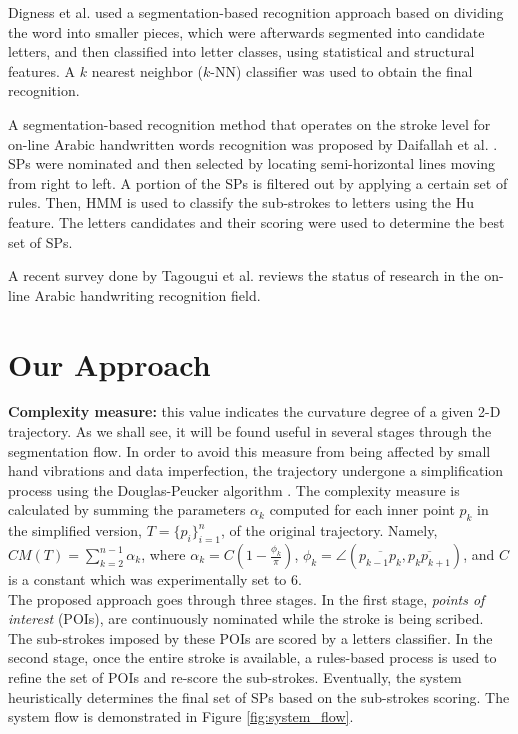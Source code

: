 \documentclass[10pt, conference, compsocconf]{IEEEtran}
\begin{document}
Digness et al. \cite{Dinges2011} used a segmentation-based recognition approach based on dividing the word into smaller pieces, which were afterwards segmented into candidate letters, and then classified into letter classes, using statistical and structural features. 
A $k$ nearest neighbor ($k$-NN) classifier was used to obtain the final recognition.

A segmentation-based recognition method that operates on the stroke level for on-line Arabic handwritten words recognition was proposed by Daifallah et al. \cite{daifallah2009recognition}. 
SPs were nominated and then selected by locating semi-horizontal lines moving from right to left. 
A portion of the SPs is filtered out by applying a certain set of rules. 
Then, HMM is used to classify the sub-strokes to letters using the Hu feature. 
The letters candidates and their scoring were used to determine the best set of SPs.

A recent survey done by Tagougui et al. \cite{tagougui2013online} reviews the status of research in the on-line Arabic handwriting recognition field. 

\section{Our Approach}
\label{sec:approach}

\textbf{Complexity measure:} this value indicates the curvature degree of a given 2-D trajectory. 
As we shall see, it will be found useful in several stages through the segmentation flow.
In order to avoid this measure from being affected by small hand vibrations and data imperfection, the trajectory undergone a simplification process using the Douglas-Peucker algorithm \cite{douglas1973algorithms}.
The complexity measure is calculated by summing the parameters $\alpha_{k}$ computed for each inner point $p_k$ in the simplified version, $T=\{p_i\}_{i=1}^{n}$, of the original trajectory.
Namely, $CM(T)=\sum_{k=2}^{n-1}{\alpha_k}$, where $\alpha_{k}=C(1-\frac{\phi_k}{\pi})$, $\phi_k=\angle(\overline{p_{k-1}p_{k}},\overline{p_{k}p_{k+1}})$, and $C$ is a constant which was experimentally set to 6.\\

The proposed approach goes through three stages. 
In the first stage, \emph{points of interest} (POIs), are continuously nominated while the stroke is being scribed.
The sub-strokes imposed by these POIs are scored by a letters classifier. 
In the second stage, once the entire stroke is available, a rules-based process is used to refine the set of POIs and re-score the sub-strokes. 
Eventually, the system heuristically determines the final set of SPs based on the sub-strokes scoring. The system flow is demonstrated in Figure \ref{fig:system_flow}. 
\end{document}
